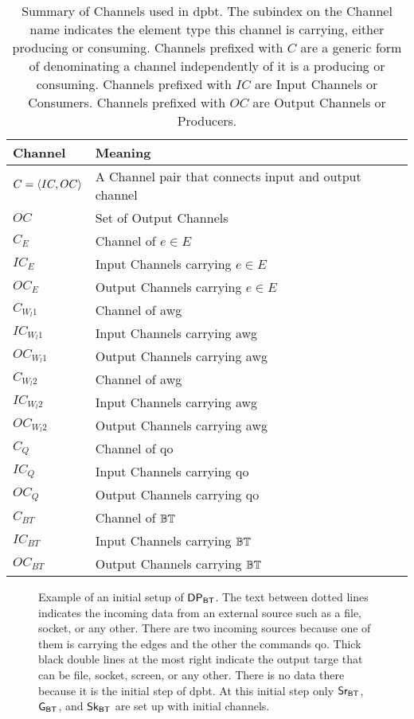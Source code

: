 \begin{table}[ht!]
\centering
\begin{tabular}{|p{0.2\linewidth}|p{0.8\linewidth}|} \hline
\textbf{Channel} & \textbf{Meaning}\\ \hline
$C = \left\langle IC, OC \right\rangle$ & A Channel pair that connects input and output channel\\ \hline
$OC$ & Set of Output Channels \\ \hline
$C_E$ & Channel of $e \in E$ \\ \hline
$IC_E$ & Input Channels carrying $e \in E$ \\ \hline
$OC_E$ & Output Channels carrying $e \in E$ \\ \hline
$C_{W_l1}$ & Channel of \acrshort{awg} \\ \hline
$IC_{W_l1}$ & Input Channels carrying \acrshort{awg} \\ \hline
$OC_{W_l1}$ & Output Channels carrying \acrshort{awg} \\ \hline
$C_{W_l2}$ & Channel of \acrshort{awg} \\ \hline
$IC_{W_l2}$ & Input Channels carrying \acrshort{awg} \\ \hline
$OC_{W_l2}$ & Output Channels carrying \acrshort{awg} \\ \hline
$C_Q$ & Channel of \acrshort{qo} \\ \hline
$IC_Q$ & Input Channels carrying \acrshort{qo} \\ \hline
$OC_Q$ & Output Channels carrying \acrshort{qo} \\ \hline
$C_{BT}$ & Channel of $\mathbb{BT}$ \\ \hline
$IC_{BT}$ & Input Channels carrying $\mathbb{BT}$ \\ \hline
$OC_{BT}$ & Output Channels carrying $\mathbb{BT}$ \\ \hline
\end{tabular}
\caption[{[\acrshort{iebt}] Summary of Channels used in \acrshort{dpbt}}]{Summary of Channels used in \acrshort{dpbt}. The subindex on the Channel name indicates the element type this channel is carrying, either producing or consuming. Channels prefixed with $C$ are a generic form of denominating a channel independently of it is a producing or consuming. Channels prefixed with $IC$ are Input Channels or Consumers. Channels prefixed with $OC$ are Output Channels or Producers.}
\label{table:channels}
\end{table}

 
\begin{figure}[h]
\centering  
{}
\caption[{[\acrshort{iebt}] $\dpbt$ Initial setup}]{Example of an initial setup of $\dpbt$. The text between dotted lines indicates the incoming data from an external source such as a file, socket, or any other. There are two incoming sources because one of them is carrying the edges and the other the commands \acrshort{qo}. Thick black double lines at the most right indicate the output targe that can be file, socket, screen, or any other. There is no data there because it is the initial step of \acrshort{dpbt}. At this initial step only $\mathsf{Sr_{BT}}$, $\mathsf{G_{BT}}$, and $\mathsf{Sk_{BT}}$ are set up with initial channels.}
\label{fig:btDP}
\end{figure}

